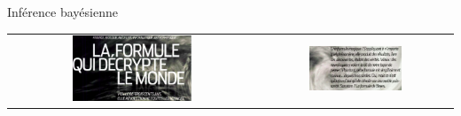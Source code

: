 \documentclass[9pt,ignorenonframetext,]{beamer}
\begin{document}
\begin{frame}{Inférence bayésienne}
\protect\hypertarget{infuxe9rence-bayuxe9sienne-2}{}

\begin{tabular}{cc}
\includegraphics[width = 0.5\textwidth, height=0.5\textwidth]{figures/formule_bayes_1.png}&
\includegraphics[width = 0.5\textwidth, height=0.5\textwidth]{figures/formule_bayes_2.png}
\end{tabular}

\end{frame}
\end{document}
